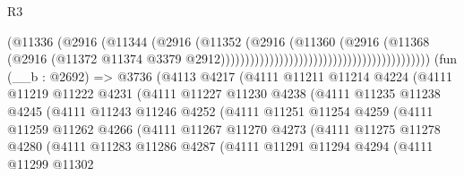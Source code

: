 \begin{lexlean}{R3}
\begin{coremodule}
                                                                    (@11336
                                                                      (@2916
                                                                        (@11344
                                                                          (@2916
                                                                            (@11352
                                                                              (@2916
                                                                                (@11360
                                                                                  (@2916
                                                                                    (@11368
                                                                                      (@2916
                                                                                        (@11372
                                                                                          @11374
                                                                                          @3379
                                                                                          @2912)))))))))))))))))))))))))))))))))))))))))))
    (fun (__b : @2692) =>
    @3736
      (@4113
        @4217
        (@4111
          @11211
          @11214
          @4224
          (@4111
            @11219
            @11222
            @4231
            (@4111
              @11227
              @11230
              @4238
              (@4111
                @11235
                @11238
                @4245
                (@4111
                  @11243
                  @11246
                  @4252
                  (@4111
                    @11251
                    @11254
                    @4259
                    (@4111
                      @11259
                      @11262
                      @4266
                      (@4111
                        @11267
                        @11270
                        @4273
                        (@4111
                          @11275
                          @11278
                          @4280
                          (@4111
                            @11283
                            @11286
                            @4287
                            (@4111
                              @11291
                              @11294
                              @4294
                              (@4111
                                @11299
                                @11302

\end{coremodule}
\end{lexlean}
